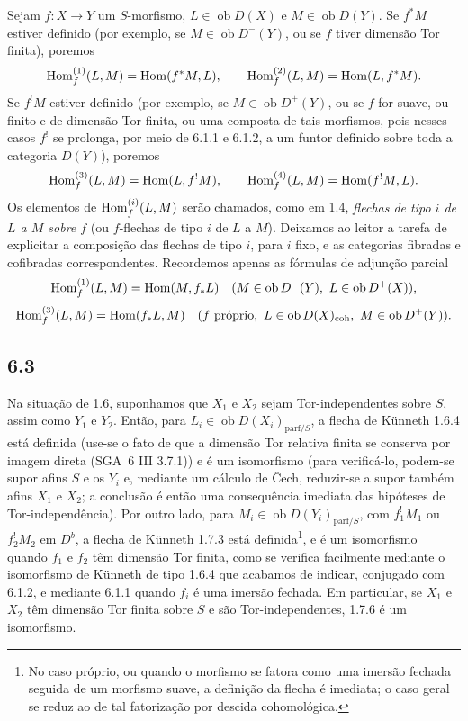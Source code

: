 Sejam $f:X\to Y$ um $S$-morfismo, $L\in\operatorname{ob}D(X)$ e $M\in\operatorname{ob}D(Y)$. Se $f^*M$ estiver definido (por exemplo, se $M\in\operatorname{ob}D^-(Y)$, ou se $f$ tiver dimensão Tor finita), poremos
\[
\operatorname{Hom}_f^{(1)}(L,M)=\operatorname{Hom}(f^*M,L),\qquad
\operatorname{Hom}_f^{(2)}(L,M)=\operatorname{Hom}(L,f^*M).
\]
Se $f^!M$ estiver definido (por exemplo, se $M\in\operatorname{ob}D^+(Y)$, ou se $f$ for suave, ou finito e de dimensão Tor finita, ou uma composta de tais morfismos, pois nesses casos $f^!$ se prolonga, por meio de 6.1.1 e 6.1.2, a um funtor definido sobre toda a categoria $D(Y)$), poremos
\[
\operatorname{Hom}_f^{(3)}(L,M)=\operatorname{Hom}(L,f^!M),\qquad
\operatorname{Hom}_f^{(4)}(L,M)=\operatorname{Hom}(f^!M,L).
\]
Os elementos de $\operatorname{Hom}_f^{(i)}(L,M)$ serão chamados, como em 1.4, \emph{flechas de tipo $i$ de $L$ a $M$ sobre $f$} (ou $f$-flechas de tipo $i$ de $L$ a $M$). Deixamos ao leitor a tarefa de explicitar a composição das flechas de tipo $i$, para $i$ fixo, e as categorias fibradas e cofibradas correspondentes. Recordemos apenas as fórmulas de adjunção parcial
\[
\Hom_f^{(1)}(L,M)=\Hom(M,f_*L)\quad(M\in\operatorname{ob}D^{-}(Y),\ L\in\operatorname{ob}D^+(X)),
\]
\[
\Hom_f^{(3)}(L,M)=\Hom(f_*L,M)\quad(f\text{ próprio},\ L\in\operatorname{ob}D(X)_{\mathrm{coh}},\ M\in\operatorname{ob}D^+(Y)).
\]

\subsection*{6.3}
Na situação de 1.6, suponhamos que $X_1$ e $X_2$ sejam Tor-independentes sobre $S$, assim como $Y_1$ e $Y_2$. Então, para $L_i\in\operatorname{ob}D(X_i)_{\mathrm{parf}/S}$, a flecha de Künneth 1.6.4 está definida (use-se o fato de que a dimensão Tor relativa finita se conserva por imagem direta (SGA~6 III 3.7.1)) e é um isomorfismo (para verificá-lo, podem-se supor afins $S$ e os $Y_i$ e, mediante um cálculo de Čech, reduzir-se a supor também afins $X_1$ e $X_2$; a conclusão é então uma consequência imediata das hipóteses de Tor-independência). Por outro lado, para $M_i\in\operatorname{ob}D(Y_i)_{\mathrm{parf}/S}$, com $f_1^!M_1$ ou $f_2^!M_2$ em $D^b$, a flecha de Künneth 1.7.3 está definida\footnote{No caso próprio, ou quando o morfismo se fatora como uma imersão fechada seguida de um morfismo suave, a definição da flecha é imediata; o caso geral se reduz ao de tal fatorização por descida cohomológica.}, e é um isomorfismo quando $f_1$ e $f_2$ têm dimensão Tor finita, como se verifica facilmente mediante o isomorfismo de Künneth de tipo 1.6.4 que acabamos de indicar, conjugado com 6.1.2, e mediante 6.1.1 quando $f_i$ é uma imersão fechada. Em particular, se $X_1$ e $X_2$ têm dimensão Tor finita sobre $S$ e são Tor-independentes, 1.7.6 é um isomorfismo.

